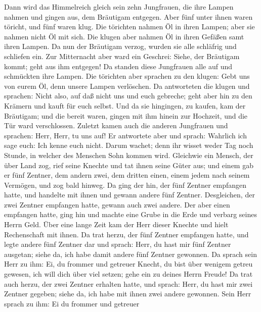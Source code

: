 Dann wird das Himmelreich gleich sein zehn Jungfrauen, die
ihre Lampen nahmen und gingen aus, dem Bräutigam entgegen. 
Aber fünf unter ihnen waren töricht, und fünf waren klug. 
Die törichten nahmen Öl in ihren Lampen; aber sie nahmen nicht Öl mit
sich.  Die klugen aber nahmen Öl in ihren Gefäßen samt ihren
Lampen.  Da nun der Bräutigam verzog, wurden sie alle
schläfrig und schliefen ein.  Zur Mitternacht aber ward ein
Geschrei: Siehe, der Bräutigam kommt; geht aus ihm entgegen!
 Da standen diese Jungfrauen alle auf und schmückten ihre
Lampen.  Die törichten aber sprachen zu den klugen: Gebt uns
von eurem Öl, denn unsere Lampen verlöschen.  Da antworteten
die klugen und sprachen: Nicht also, auf daß nicht uns und euch
gebreche; geht aber hin zu den Krämern und kauft für euch selbst.
 Und da sie hingingen, zu kaufen, kam der Bräutigam; und
die bereit waren, gingen mit ihm hinein zur Hochzeit, und die Tür ward
verschlossen.  Zuletzt kamen auch die anderen Jungfrauen
und sprachen: Herr, Herr, tu uns auf!  Er antwortete aber
und sprach: Wahrlich ich sage euch: Ich kenne euch nicht. 
Darum wachet; denn ihr wisset weder Tag noch Stunde, in welcher des
Menschen Sohn kommen wird.  Gleichwie ein Mensch, der über
Land zog, rief seine Knechte und tat ihnen seine Güter aus;
 und einem gab er fünf Zentner, dem andern zwei, dem
dritten einen, einem jedem nach seinem Vermögen, und zog bald hinweg.
 Da ging der hin, der fünf Zentner empfangen hatte, und
handelte mit ihnen und gewann andere fünf Zentner. 
Desgleichen, der zwei Zentner empfangen hatte, gewann auch zwei andere.
 Der aber einen empfangen hatte, ging hin und machte eine
Grube in die Erde und verbarg seines Herrn Geld.  Über eine
lange Zeit kam der Herr dieser Knechte und hielt Rechenschaft mit ihnen.
 Da trat herzu, der fünf Zentner empfangen hatte, und legte
andere fünf Zentner dar und sprach: Herr, du hast mir fünf Zentner
ausgetan; siehe da, ich habe damit andere fünf Zentner gewonnen.
 Da sprach sein Herr zu ihm: Ei, du frommer und getreuer
Knecht, du bist über wenigem getreu gewesen, ich will dich über viel
setzen; gehe ein zu deines Herrn Freude!  Da trat auch
herzu, der zwei Zentner erhalten hatte, und sprach: Herr, du hast mir
zwei Zentner gegeben; siehe da, ich habe mit ihnen zwei andere gewonnen.
 Sein Herr sprach zu ihm: Ei du frommer und getreuer
